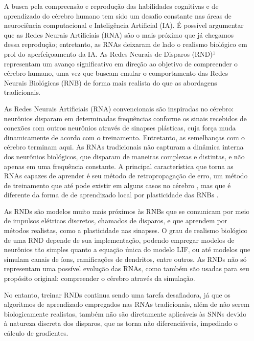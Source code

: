 
A busca pela compreensão e reprodução das habilidades cognitivas e de aprendizado do cérebro humano tem sido um desafio constante
nas áreas de neurociência computacional e Inteligência Artificial (IA). É possível argumentar que as Redes Neurais Artificiais
(RNA) são o mais próximo que já chegamos dessa reprodução; entretanto, as RNAs deixaram de lado o realismo biológico em prol do
aperfeiçoamento da IA. As Redes Neurais de Disparos (RND)¹ representam um avanço significativo em direção ao objetivo de
compreender o cérebro humano, uma vez que buscam emular o comportamento das Redes Neurais Biológicas (RNB) de forma mais realista
do que as abordagens tradicionais.

As Redes Neurais Artificiais (RNA) convencionais são inspiradas no cérebro: neurônios disparam em determinadas frequências
conforme os sinais recebidos de conexões com outros neurônios através de sinapses plásticas, cuja força muda dinamicamente de
acordo com o treinamento. Entretanto, as semelhanças com o cérebro terminam aqui. As RNAs tradicionais não capturam a dinâmica
interna dos neurônios biológicos, que disparam de maneiras complexas e distintas, e não apenas em uma frequência constante. A
principal característica que torna as RNAs capazes de aprender é seu método de retropropagação de erro, um método de treinamento
que até pode existir em alguns casos no cérebro \cite{lillicrapBackpropagationBrain2020} \cite{songCanBrainBackpropagation2020},
mas que é diferente da forma de de aprendizado local por plasticidade das RNBs \cite{yamazakiSpikingNeuralNetworks2022}.

As RNDs são modelos muito mais próximos às RNBs que se comunicam por meio de impulsos elétricos discretos, chamados de disparos, e
que aprendem por métodos realistas, como a plasticidade nas sinapses. O grau de realismo biológico de uma RND depende de sua
implementação, podendo empregar modelos de neurônios tão simples quanto a equação única do modelo LIF, ou até modelos que simulam
canais de íons, ramificações de dendritos, entre outros. As RNDs não só representam uma possível evolução das RNAs, como também
são usadas para seu propósito original: compreender o cérebro através da simulação.

No entanto, treinar RNDs continua sendo uma tarefa desafiadora, já que os algoritmos de aprendizado empregados nas RNAs
tradicionais, além de não serem biologicamente realistas, também não são diretamente aplicáveis às SNNs devido à natureza discreta
dos disparos, que as torna não diferenciáveis, impedindo o cálculo de gradientes.

